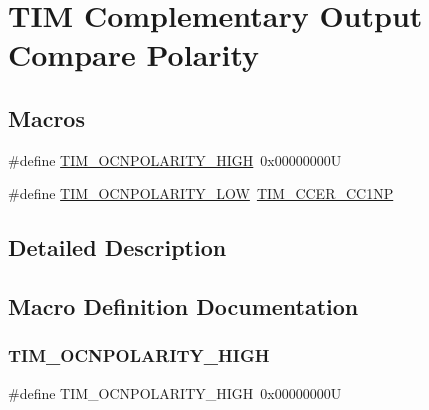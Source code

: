\hypertarget{group___t_i_m___output___compare___n___polarity}{}\section{T\+IM Complementary Output Compare Polarity}
\label{group___t_i_m___output___compare___n___polarity}
\subsection*{Macros}
\begin{DoxyCompactItemize}
\item 
\#define \mbox{\hyperlink{group___t_i_m___output___compare___n___polarity_gad5dbeb61519e4fd55db3a4d136e96316}{T\+I\+M\+\_\+\+O\+C\+N\+P\+O\+L\+A\+R\+I\+T\+Y\+\_\+\+H\+I\+GH}}~0x00000000U
\item 
\#define \mbox{\hyperlink{group___t_i_m___output___compare___n___polarity_gadb44419c891a58e2cde11cc016f71a14}{T\+I\+M\+\_\+\+O\+C\+N\+P\+O\+L\+A\+R\+I\+T\+Y\+\_\+\+L\+OW}}~\mbox{\hyperlink{group___peripheral___registers___bits___definition_ga403fc501d4d8de6cabee6b07acb81a36}{T\+I\+M\+\_\+\+C\+C\+E\+R\+\_\+\+C\+C1\+NP}}
\end{DoxyCompactItemize}


\subsection{Detailed Description}


\subsection{Macro Definition Documentation}
\mbox{\label{group___t_i_m___output___compare___n___polarity_gad5dbeb61519e4fd55db3a4d136e96316}} 
\subsubsection{\texorpdfstring{TIM\_OCNPOLARITY\_HIGH}{TIM\_OCNPOLARITY\_HIGH}}
{\footnotesize\ttfamily \#define T\+I\+M\+\_\+\+O\+C\+N\+P\+O\+L\+A\+R\+I\+T\+Y\+\_\+\+H\+I\+GH~0x00000000U}


